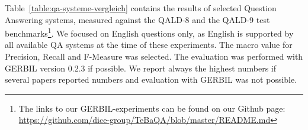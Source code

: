 \documentclass{IOS-Book-Article}
\begin{document}
Table~\ref{table:qa-systeme-vergleich} contains the results of selected Question Answering systems, measured against the QALD-8 and the QALD-9 test benchmarks\footnote{The links to our GERBIL-experiments can be found on our Github page: \url{https://github.com/dice-group/TeBaQA/blob/master/README.md}}. We focused on English questions only, as English is supported by all available QA systems at the time of these experiments. The macro value for Precision, Recall and F-Measure was selected. The evaluation was performed with GERBIL version 0.2.3 if possible. We report always the highest numbers if several papers reported numbers and evaluation with GERBIL was not possible. 
\begin{table}[htb!]
    \setlength{\tabcolsep}{6pt}
    	\centering
    	\caption{Results of TeBaQA and other state-of-the-art QA systems for multiple datasets. * indicates F-1 measure instead of QALD F-Measure~\cite{DBLP:journals/semweb/UsbeckRHCHNDU19}. ** Numbers taken from the corresponding paper.}
    	\label{table:qa-systeme-vergleich}
\end{table}
\end{document}
